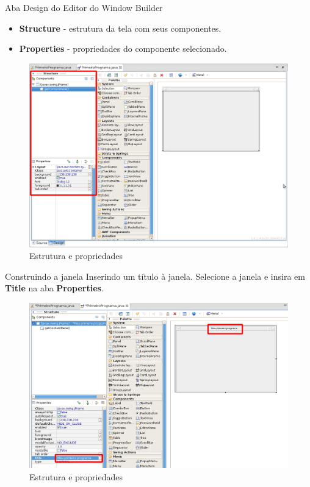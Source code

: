 \documentclass[10pt]{beamer}
\begin{document}
\begin{frame}{Aba Design do Editor do Window Builder}
\begin{itemize}
\item \textbf{Structure} - estrutura da tela com seus componentes.
\item \textbf{Properties} - propriedades do componente selecionado.
\end{itemize}
  \begin{figure}[!htb]
    \centering
    \includegraphics[scale=.25]{windows_builder_perspective_part3}
    \caption{Estrutura e propriedades}
    \label{figRotulo}
  \end{figure}
\end{frame}{}

\begin{frame}{Construindo a janela}
Inserindo um título à janela.
\linebreak
Selecione a janela e insira em \textbf{Title} na aba \textbf{Properties}.
  \begin{figure}[!htb]
    \centering
    \includegraphics[scale=.3]{colocando_titulo}
    \caption{Estrutura e propriedades}
    \label{figRotulo}
  \end{figure}
\end{frame}{}
\end{document}
